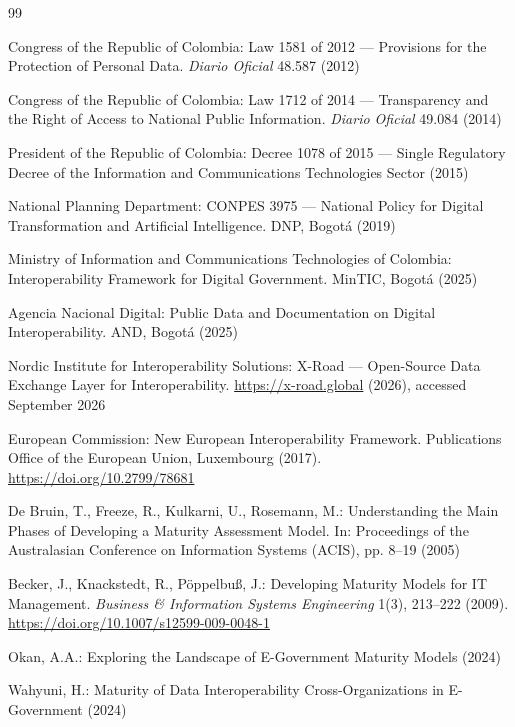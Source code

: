 \documentclass[runningheads]{llncs}
\begin{document}
\begin{thebibliography}{99}

Congress of the Republic of Colombia: Law 1581 of 2012 --- Provisions for the
Protection of Personal Data. \emph{Diario Oficial} 48.587 (2012)

Congress of the Republic of Colombia: Law 1712 of 2014 --- Transparency and the
Right of Access to National Public Information. \emph{Diario Oficial} 49.084
(2014)

President of the Republic of Colombia: Decree 1078 of 2015 --- Single
Regulatory Decree of the Information and Communications Technologies Sector
(2015)

National Planning Department: CONPES 3975 --- National Policy for Digital
Transformation and Artificial Intelligence. DNP, Bogot\'a (2019)

Ministry of Information and Communications Technologies of Colombia:
Interoperability Framework for Digital Government. MinTIC, Bogot\'a (2025)

Agencia Nacional Digital: Public Data and Documentation on Digital
Interoperability. AND, Bogot\'a (2025)

Nordic Institute for Interoperability Solutions: X-Road --- Open-Source Data
Exchange Layer for Interoperability. \url{https://x-road.global} (2026),
accessed September 2026

European Commission: New European Interoperability Framework. Publications
Office of the European Union, Luxembourg (2017).
\url{https://doi.org/10.2799/78681}

De Bruin, T., Freeze, R., Kulkarni, U., Rosemann, M.: Understanding the Main
Phases of Developing a Maturity Assessment Model. In: Proceedings of the
Australasian Conference on Information Systems (ACIS), pp. 8--19 (2005)

Becker, J., Knackstedt, R., P\"oppelbu\ss, J.: Developing Maturity Models for IT
Management. \emph{Business \& Information Systems Engineering} 1(3), 213--222
(2009). \url{https://doi.org/10.1007/s12599-009-0048-1}

Okan, A.A.: Exploring the Landscape of E-Government Maturity Models (2024)

Wahyuni, H.: Maturity of Data Interoperability Cross-Organizations in
E-Government (2024)


\end{thebibliography}
\end{document}
